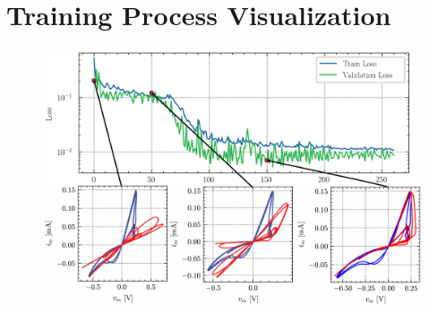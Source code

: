 \documentclass[11pt, oneside]{article}
\begin{document}
\section*{Training Process Visualization}

\begin{figure}[H]
    \centering
    \includegraphics[width=0.8\linewidth]{figs/Training_process.pdf}
    \caption*{}
\end{figure}

\printbibliography[heading=bibintoc]
\end{document}
